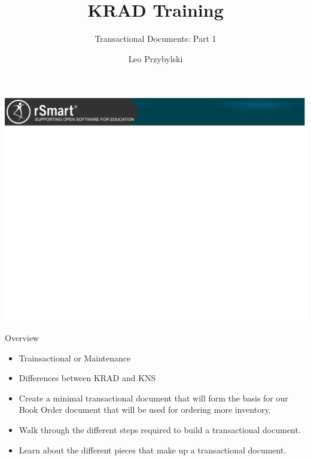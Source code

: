 \documentclass[xcolor=dvipsnames,14pt,professionalfonts]{beamer}
\begin{document}
\title{KRAD Training}
\subtitle{Transactional Documents: Part 1}
\author[Leo]{Leo Przybylski}

\usebackgroundtemplate%
{%
    \includegraphics[width=\paperwidth,height=\paperheight]{../img/header.png}%
}

{
%
\begin{frame}[plain]
  \titlepage
\end{frame}
}

\begin{frame}{Overview}
  \begin{itemize}
  \item Trainsactional or Maintenance
  \item Differences between KRAD and KNS
  \item Create a minimal transactional document that will form the basis for our Book Order document that will be used for ordering more inventory.
  \item Walk through the different steps required to build a transactional document.
  \item Learn about the different pieces that make up a transactional document.
  \end{itemize}
\end{frame}
\end{document}
